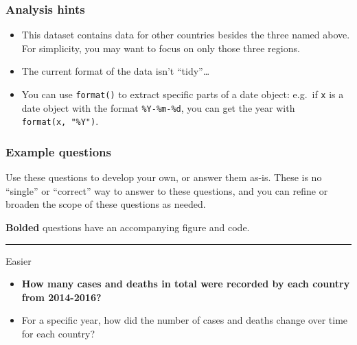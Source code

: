\documentclass[
  letterpaper,
  DIV=11,
  numbers=noendperiod]{scrreprt}
\providecommand{\tightlist}{%
  \setlength{\itemsep}{0pt}\setlength{\parskip}{0pt}}\usepackage{longtable,booktabs,array}
\begin{document}
\begin{tcolorbox}[enhanced jigsaw, bottomtitle=1mm, bottomrule=.15mm, toprule=.15mm, opacityback=0, leftrule=.75mm, breakable, colback=white, toptitle=1mm, left=2mm, coltitle=black, titlerule=0mm, opacitybacktitle=0.6, title=\textcolor{quarto-callout-tip-color}{\faLightbulb}\hspace{0.5em}{Analysis ideas and hints}, rightrule=.15mm, arc=.35mm, colframe=quarto-callout-tip-color-frame, colbacktitle=quarto-callout-tip-color!10!white]

\subsubsection{Analysis hints}

\begin{itemize}
\item
  This dataset contains data for other countries besides the three named
  above. For simplicity, you may want to focus on only those three
  regions.
\item
  The current format of the data isn't ``tidy''\ldots{}
\item
  You can use \texttt{format()} to extract specific parts of a date
  object: e.g.~if \texttt{x} is a date object with the format
  \texttt{\%Y-\%m-\%d}, you can get the year with
  \texttt{format(x,\ "\%Y")}.
\end{itemize}

\subsubsection{Example questions}

Use these questions to develop your own, or answer them as-is. These is
no ``single'' or ``correct'' way to answer to these questions, and you
can refine or broaden the scope of these questions as needed.

\textbf{Bolded} questions have an accompanying figure and code.

\begin{center}\rule{0.5\linewidth}{0.5pt}\end{center}

Easier

\begin{itemize}
\tightlist
\item
  \textbf{How many cases and deaths in total were recorded by each
  country from 2014-2016?}
\item
  For a specific year, how did the number of cases and deaths change
  over time for each country?
\end{itemize}


\end{tcolorbox}
\end{document}
